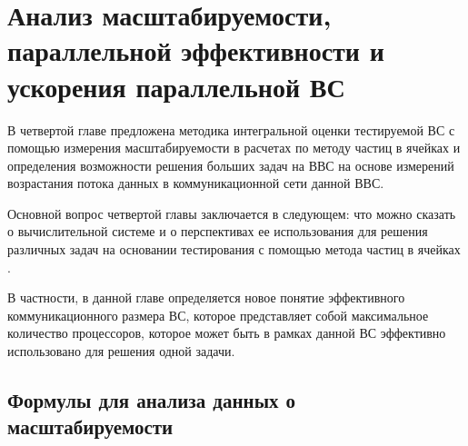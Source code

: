 \chapter{Анализ масштабируемости, параллельной эффективности и ускорения параллельной ВС}
				В четвертой главе предложена методика интегральной оценки тестируемой ВС с помощью измерения масштабируемости в расчетах по методу частиц в ячейках и определения возможности решения больших задач на ВВС на основе измерений возрастания потока данных в коммуникационной сети данной ВВС.

            Основной вопрос четвертой главы заключается в следующем: что можно сказать о вычислительной системе и о перспективах ее использования для решения различных задач на основании тестирования с помощью метода частиц в ячейках
             \cite{MohographyTarkov,VestnikNNSU,multigridAuto,AutoParSilan}. 
            
            В частности, в данной главе определяется новое понятие эффективного коммуникационного размера ВС, которое представляет собой максимальное количество процессоров, которое может быть в рамках данной ВС эффективно использовано для решения одной задачи.  
							
			
		
		\section{Формулы для анализа данных о масштабируемости}
		
